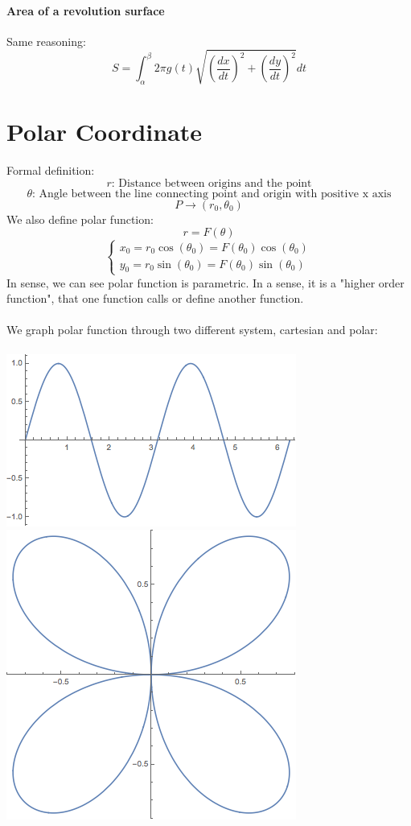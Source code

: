 \documentclass[11pt, oneside]{article}   	%
\begin{document}
\paragraph{Area of a revolution surface}
Same reasoning:
$$S = \int_\alpha^\beta 2\pi g(t) \sqrt{(\frac{dx}{dt})^2 + (\frac{dy}{dt})^2}dt$$

\section{Polar Coordinate}
Formal definition: $$r\text{: Distance between origins and the point}$$$$\theta \text{: Angle between the line connecting point and origin with positive x axis}$$ $$ P\to (r_0,\theta_0)$$
We also define polar function:
$$r = F(\theta)$$
\begin{equation}
  \begin{cases}
    x_0 = r_0 \cos(\theta_0) = F(\theta_0) \cos(\theta_0)\\
    y_0 =  r_0 \sin(\theta_0) = F(\theta_0) \sin(\theta_0)
  \end{cases}
\end{equation}
In sense, we can see polar function is parametric. In a sense, it is a "higher order function", that one function calls or define another function. 
\paragraph{}
We graph polar function through two different system, cartesian and polar: 
\paragraph{}
\includegraphics[scale = 0.5]{polarcar}
\includegraphics[scale = 0.3]{polar}
\end{document}
